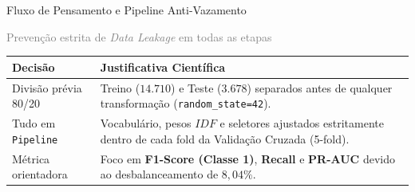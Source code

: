 \documentclass[aspectratio=43]{beamer}
\begin{document}
\begin{frame}[t]{Fluxo de Pensamento e Pipeline Anti-Vazamento}

\textcolor{gray}{\small Prevenção estrita de \textit{Data Leakage} em todas as etapas}

\vspace{0.25cm}

\begin{center}
\end{center}

\vspace{0.25cm}

\scriptsize
\renewcommand{\arraystretch}{1.22}
\begin{center}
\begin{tabular}{P{2.7cm} P{6.8cm}}
\toprule
\textbf{Decisão} & \textbf{Justificativa Científica} \\
\midrule
Divisão prévia 80/20 & Treino ($14.710$) e Teste ($3.678$) separados antes de qualquer transformação (\texttt{random\_state=42}). \\
Tudo em \texttt{Pipeline} & Vocabulário, pesos $IDF$ e seletores ajustados estritamente dentro de cada fold da Validação Cruzada (5-fold). \\
Métrica orientadora & Foco em \textbf{F1-Score (Classe 1)}, \textbf{Recall} e \textbf{PR-AUC} devido ao desbalanceamento de $8{,}04\%$. \\
\bottomrule
\end{tabular}
\end{center}

\end{frame}
\end{document}

